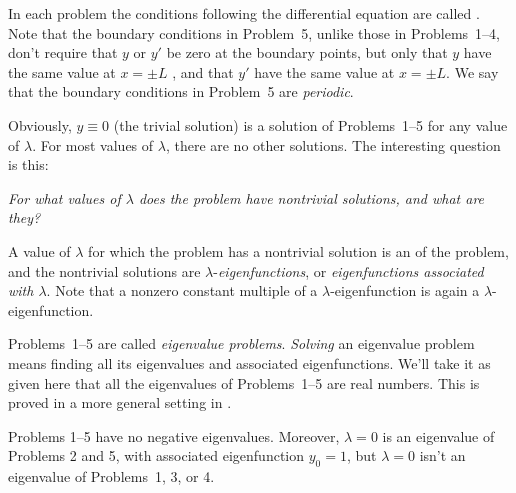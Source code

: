In each problem the conditions following the differential equation
are called .
Note that the boundary conditions in Problem~5, unlike those in
Problems~1--4, don't require that $y$ or $y'$ be zero at the boundary
points, but only that $y$ have the same value at $x=\pm L$ , and that
$y'$ have the same value at $x=\pm L$. We say that the boundary
conditions in Problem~5 are \emph{\color{blue}periodic}.

Obviously, $y\equiv0$ (the trivial solution) is a solution of
Problems~1--5 for any value of $\lambda$. For most values of $\lambda$,
there are no other solutions. The interesting question is this:

\emph{\color{blue}For what values of $\lambda$ does the problem have
nontrivial solutions, and what are they?}

A value of $\lambda$ for which the problem has
a nontrivial solution is an  of the problem, and the
nontrivial solutions are
$\lambda$-\emph{\color{blue}eigenfunctions},
or
\emph{\color{blue}eigenfunctions associated with $\lambda$}.
Note that a nonzero
constant multiple of a $\lambda$-eigenfunction is again a
$\lambda$-eigenfunction.

Problems~1--5 are called
\emph{\color{blue}eigenvalue problems}.
\emph{\color{blue}Solving} an eigenvalue problem means finding all its
eigenvalues and associated eigenfunctions. We'll take it as given here that all
the eigenvalues of Problems~1--5 are real numbers. This is proved in a more
general setting in .


\begin{theorem}\label{thmtype:11.1.1}
Problems 1--5 have no negative eigenvalues. Moreover, $\lambda=0$
is an eigenvalue of Problems 2 and 5, with associated
eigenfunction $y_0=1$, but $\lambda=0$ isn't  an eigenvalue of
Problems~1, 3, or 4.
\end{theorem}

